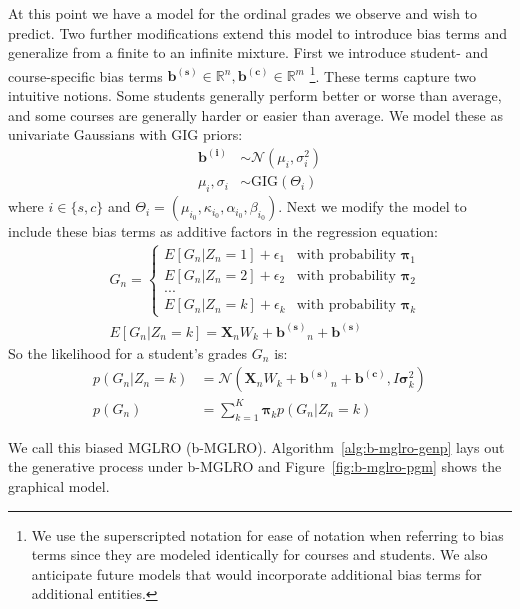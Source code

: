 \documentclass[10pt]{proc}
\newcommand*{\bias}[1]{ \bm{b^{(#1)}} }
\begin{document}
At this point we have a model for the ordinal grades we observe and
wish to predict. Two further modifications extend this model to introduce bias
terms and generalize from a finite to an infinite mixture. First we introduce
student- and course-specific bias terms $\bias{s} \in \mathbb{R}^n,
\bias{c} \in \mathbb{R}^m$ \footnote{We use the superscripted notation for
ease of notation when referring to bias terms since they are modeled
identically for courses and students. We also anticipate future models that
would incorporate additional bias terms for additional entities.}.
These terms capture two intuitive notions. Some students generally perform
better or worse than average, and some courses are generally harder or easier
than average. We model these as univariate Gaussians with GIG priors:
%
\begin{align}
    \bias{i} &\sim \mathcal{N}(\mu_i, \sigma_i^2)  \\
    \mu_i, \sigma_i &\sim \text{GIG}(\Theta_i)
\end{align}
%
where $i \in \{s, c\}$ and $\Theta_i = (\mu_{i_0}, \kappa_{i_0}, \alpha_{i_0},
\beta_{i_0})$. Next we modify the model to include these bias terms as additive
factors in the regression equation:
%
\begin{align}
    &G_n =
    \begin{cases}
        E[G_n | Z_n = 1] + \epsilon_1  &  \text{with probability } \bm{\pi}_1  \\
        E[G_n | Z_n = 2] + \epsilon_2  &  \text{with probability } \bm{\pi}_2  \\
        ...                            &                                       \\
        E[G_n | Z_n = k] + \epsilon_k  &  \text{with probability } \bm{\pi}_k
    \end{cases}  \\
    &E[G_n | Z_n = k] = \bm{X}_n W_k + \bias{s}_n + \bias{s}
\end{align}
%
So the likelihood for a student's grades $G_n$ is:
%
\begin{align}
    p(G_n | Z_n = k) &=
        \mathcal{N}(
            \bm{X}_n W_k + \bias{s}_n + \bias{c}, I \bm{\sigma}_k^2)  \\
    p(G_n) &= \sum_{k=1}^K \bm{\pi}_k p(G_n | Z_n = k)
\end{align}

We call this biased MGLRO (b-MGLRO). Algorithm~\ref{alg:b-mglro-genp} lays out
the generative process under b-MGLRO and Figure~\ref{fig:b-mglro-pgm} shows the
graphical model.
\end{document}
